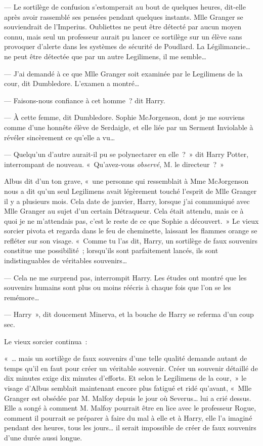 --- Le sortilège de confusion s'estomperait au bout de quelques heures, dit-elle après avoir rassemblé ses pensées pendant quelques instants. Mlle Granger se souviendrait de l'Imperius. Oubliettes ne peut être détecté par aucun moyen connu, mais seul un professeur aurait pu lancer ce sortilège sur un élève sans provoquer d'alerte dans les systèmes de sécurité de Poudlard. La Légilimancie… ne peut être détectée que par un autre Legilimens, il me semble…

--- J'ai demandé à ce que Mlle Granger soit examinée par le Legilimens de la cour, dit Dumbledore. L'examen a montré…

--- Faisons-nous confiance à cet homme~? dit Harry.

--- À cette femme, dit Dumbledore. Sophie McJorgenson, dont je me souviens comme d'une honnête élève de Serdaigle, et elle liée par un Serment Inviolable à révéler sincèrement ce qu'elle a vu…

--- Quelqu'un d'autre aurait-il pu se polynectarer en elle~?~» dit Harry Potter, interrompant de nouveau. «~Qu'avez-vous \emph{observé}, M. le directeur~?~»

Albus dit d'un ton grave, «~une personne qui ressemblait à Mme McJorgenson nous a dit qu'un seul Legilimens avait légèrement touché l'esprit de Mlle Granger il y a plusieurs mois. Cela date de janvier, Harry, lorsque j'ai communiqué avec Mlle Granger au sujet d'un certain Détraqueur. Cela était attendu, mais ce à quoi je ne m'attendais pas, c'est le reste de ce que Sophie a découvert.~» Le vieux sorcier pivota et regarda dans le feu de cheminette, laissant les flammes orange se refléter sur son visage. «~Comme tu l'as dit, Harry, un sortilège de faux souvenirs constitue une possibilité~; lorsqu'ils sont parfaitement lancés, ils sont indistinguables de véritables souvenirs…

--- Cela ne me surprend pas, interrompit Harry. Les études ont montré que les souvenirs humains sont plus ou moins réécris à chaque fois que l'on se les remémore…

--- Harry~», dit doucement Minerva, et la bouche de Harry se referma d'un coup sec.

Le vieux sorcier continua~:

«~… mais un sortilège de faux souvenirs d'une telle qualité demande autant de temps qu'il en faut pour créer un véritable souvenir. Créer un souvenir détaillé de dix minutes exige dix minutes d'efforts. Et selon le Legilimens de la cour,~» le visage d'Albus semblait maintenant encore plus fatigué et ridé qu'avant, «~Mlle Granger est obsédée par M. Malfoy depuis le jour où Severus… lui a crié dessus. Elle a songé à comment M. Malfoy pourrait être en lice avec le professeur Rogue, comment il pourrait se préparer à faire du mal à elle et à Harry, elle l'a imaginé pendant des heures, tous les jours… il serait impossible de créer de faux souvenirs d'une durée aussi longue.

